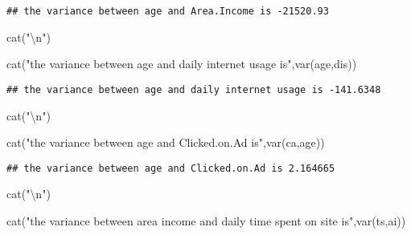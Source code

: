\documentclass[
]{article}
\newenvironment{Shaded}{\begin{snugshade}}{\end{snugshade}}
\newcommand{\FunctionTok}[1]{\textcolor[rgb]{0.00,0.00,0.00}{#1}}
\newcommand{\NormalTok}[1]{#1}
\newcommand{\SpecialCharTok}[1]{\textcolor[rgb]{0.00,0.00,0.00}{#1}}
\newcommand{\StringTok}[1]{\textcolor[rgb]{0.31,0.60,0.02}{#1}}
\begin{document}
\begin{verbatim}
## the variance between age and Area.Income is -21520.93
\end{verbatim}

\begin{Shaded}
\begin{Highlighting}[]
\FunctionTok{cat}\NormalTok{(}\StringTok{"}\SpecialCharTok{\textbackslash{}n}\StringTok{"}\NormalTok{)}
\end{Highlighting}
\end{Shaded}

\begin{Shaded}
\begin{Highlighting}[]
\FunctionTok{cat}\NormalTok{(}\StringTok{"the variance between age and daily internet usage is"}\NormalTok{,}\FunctionTok{var}\NormalTok{(age,dis))}
\end{Highlighting}
\end{Shaded}

\begin{verbatim}
## the variance between age and daily internet usage is -141.6348
\end{verbatim}

\begin{Shaded}
\begin{Highlighting}[]
\FunctionTok{cat}\NormalTok{(}\StringTok{"}\SpecialCharTok{\textbackslash{}n}\StringTok{"}\NormalTok{)}
\end{Highlighting}
\end{Shaded}

\begin{Shaded}
\begin{Highlighting}[]
\FunctionTok{cat}\NormalTok{(}\StringTok{"the variance between age and Clicked.on.Ad is"}\NormalTok{,}\FunctionTok{var}\NormalTok{(ca,age))}
\end{Highlighting}
\end{Shaded}

\begin{verbatim}
## the variance between age and Clicked.on.Ad is 2.164665
\end{verbatim}

\begin{Shaded}
\begin{Highlighting}[]
\FunctionTok{cat}\NormalTok{(}\StringTok{"}\SpecialCharTok{\textbackslash{}n}\StringTok{"}\NormalTok{)}
\end{Highlighting}
\end{Shaded}

\begin{Shaded}
\begin{Highlighting}[]
\FunctionTok{cat}\NormalTok{(}\StringTok{"the variance between area income and daily time spent on site is"}\NormalTok{,}\FunctionTok{var}\NormalTok{(ts,ai))}
\end{Highlighting}
\end{Shaded}
\end{document}
